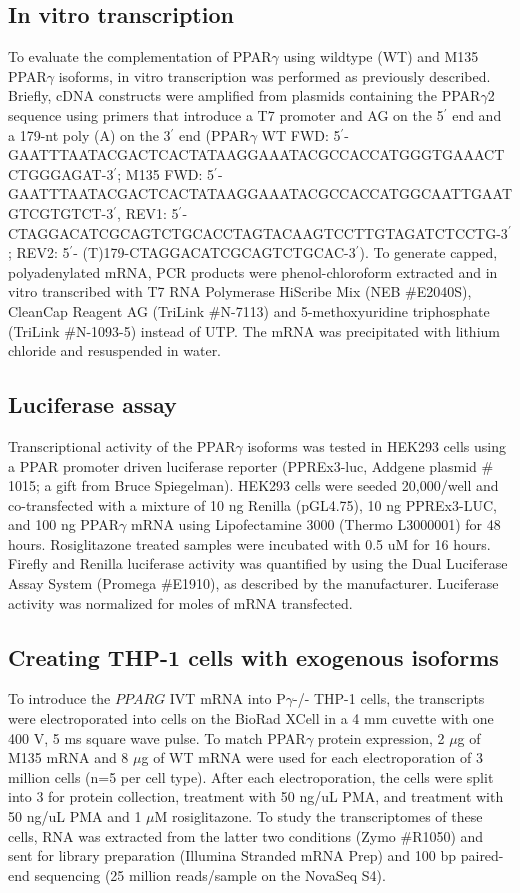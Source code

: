 \subsection{In vitro transcription}
To evaluate the complementation of PPAR$\gamma$ using wildtype (WT) and M135 PPAR$\gamma$ isoforms, in vitro transcription was performed as previously described\cite{Heinz2018-mp}. Briefly, cDNA constructs were amplified from plasmids containing the PPAR$\gamma$2 sequence using primers that introduce a T7 promoter and AG on the 5$^{\prime}$ end and a 179-nt poly (A) on the 3$^{\prime}$ end (PPAR$\gamma$ WT FWD: 5$^{\prime}$-GAATTTAATACGACTCACTATAAGGAAATACGCCACCATGGGTGAAACTCTGGGAGAT-3$^{\prime}$; M135 FWD: 5$^{\prime}$-GAATTTAATACGACTCACTATAAGGAAATACGCCACCATGGCAATTG\newline AATGTCGTGTCT-3$^{\prime}$, REV1: 5$^{\prime}$-CTAGGACATCGCAGTCTGCACCTAGTACAAGTCCTTG\newline TAGATCTCCTG-3$^{\prime}$; REV2: 5$^{\prime}$- (T)179-CTAGGACATCGCAGTCTGCAC-3$^{\prime}$). To generate capped, polyadenylated mRNA, PCR products were phenol-chloroform extracted and in vitro transcribed with T7 RNA Polymerase HiScribe Mix (NEB \#E2040S), CleanCap Reagent AG (TriLink \#N-7113) and 5-methoxyuridine triphosphate (TriLink \#N-1093-5) instead of UTP. The mRNA was precipitated with lithium chloride and resuspended in water.

\subsection{Luciferase assay}
Transcriptional activity of the PPAR$\gamma$ isoforms was tested in HEK293 cells using a PPAR promoter driven luciferase reporter (PPREx3-luc, Addgene plasmid \# 1015; a gift from Bruce Spiegelman). HEK293 cells were seeded 20,000/well and co-transfected with a mixture of 10 ng Renilla (pGL4.75), 10 ng PPREx3-LUC, and 100 ng PPAR$\gamma$ mRNA using Lipofectamine 3000 (Thermo L3000001) for 48 hours. Rosiglitazone treated samples were incubated with 0.5 uM for 16 hours. Firefly and Renilla luciferase activity was quantified by using the Dual Luciferase Assay System (Promega \#E1910), as described by the manufacturer. Luciferase activity was normalized for moles of mRNA transfected.

\subsection{Creating THP-1 cells with exogenous isoforms}
To introduce the \(PPARG\) IVT mRNA into P$\gamma$-/- THP-1 cells, the transcripts were electroporated into cells on the BioRad XCell in a 4 mm cuvette with one 400 V, 5 ms square wave pulse. To match PPAR$\gamma$ protein expression, 2 $\mu$g of M135 mRNA and 8 $\mu$g of WT mRNA were used for each electroporation of 3 million cells (n=5 per cell type). After each electroporation, the cells were split into 3 for protein collection, treatment with 50 ng/uL PMA, and treatment with 50 ng/uL PMA and 1 $\mu$M rosiglitazone. To study the transcriptomes of these cells, RNA was extracted from the latter two conditions (Zymo \#R1050) and sent for library preparation (Illumina Stranded mRNA Prep) and 100 bp paired-end sequencing (25 million reads/sample on the NovaSeq S4).

